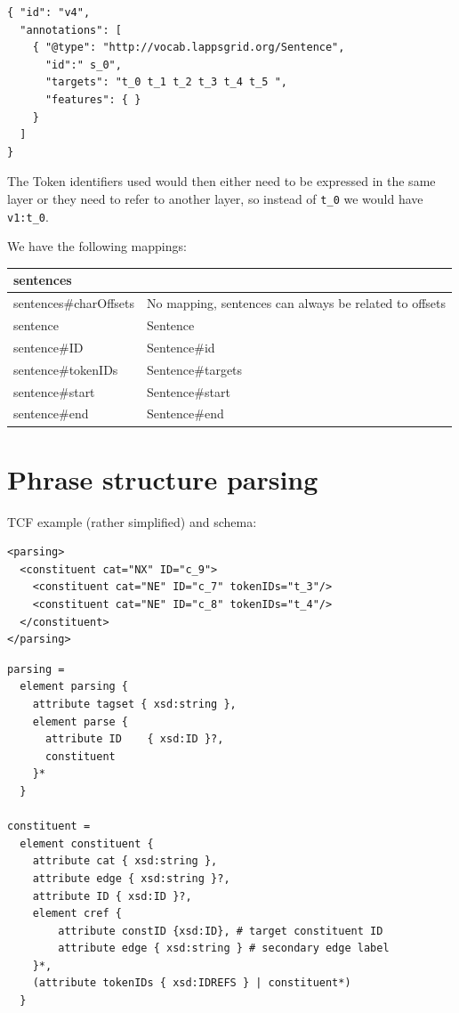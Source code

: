\documentclass[11pt]{article}
\newcommand{\attr}[1]{{\tt #1}}
\newenvironment{example}
    {\begin{tcolorbox}\small}
    {\end{tcolorbox}}
\newenvironment{mappings}
	{\medskip\begin{tabular}{|l|l|}\hline}
	{\hline\end{tabular}\medskip}
\begin{document}
\begin{example}
\begin{verbatim}
{ "id": "v4",
  "annotations": [
    { "@type": "http://vocab.lappsgrid.org/Sentence",
      "id":" s_0",
      "targets": "t_0 t_1 t_2 t_3 t_4 t_5 ",
      "features": { } 
    }
  ]
}
\end{verbatim}
\end{example}

The Token identifiers used would then either need to be expressed in the same layer or they need to refer to another layer, so instead of \attr{t\_0} we would have \attr{v1:t\_0}.

\newpage
We have the following mappings:

\begin{mappings}
sentences				& \\ \hline
sentences\#charOffsets	& No mapping, sentences can always be related to offsets \\ \hline
sentence				& Sentence \\ \hline
sentence\#ID			& Sentence\#id \\ \hline
sentence\#tokenIDs		& Sentence\#targets \\ \hline
sentence\#start 		& Sentence\#start \\ \hline
sentence\#end			& Sentence\#end \\
\end{mappings}



\section{Phrase structure parsing}

TCF example (rather simplified) and schema:

\begin{example}
\begin{verbatim}
<parsing>
  <constituent cat="NX" ID="c_9">
    <constituent cat="NE" ID="c_7" tokenIDs="t_3"/>
    <constituent cat="NE" ID="c_8" tokenIDs="t_4"/>
  </constituent>
</parsing>
\end{verbatim}
\end{example}

\begin{example}
\begin{verbatim}
parsing =
  element parsing {
    attribute tagset { xsd:string },
    element parse {
      attribute ID    { xsd:ID }?,
      constituent
    }*
  }

constituent =
  element constituent {
    attribute cat { xsd:string },
    attribute edge { xsd:string }?,
    attribute ID { xsd:ID }?,
    element cref {
        attribute constID {xsd:ID}, # target constituent ID
        attribute edge { xsd:string } # secondary edge label
    }*,
    (attribute tokenIDs { xsd:IDREFS } | constituent*)
  }
\end{verbatim}
\end{example}
\end{document}
